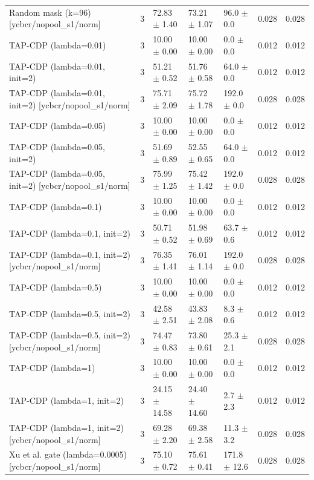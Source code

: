 \begin{tabular}{lrlllrr}
Random mask (k=96) [ycbcr/nopool_s1/norm] & 3 & 72.83 $\pm$ 1.40 & 73.21 $\pm$ 1.07 & 96.0 $\pm$ 0.0 & 0.028 & 0.028 \\
TAP-CDP (lambda=0.01) & 3 & 10.00 $\pm$ 0.00 & 10.00 $\pm$ 0.00 & 0.0 $\pm$ 0.0 & 0.012 & 0.012 \\
TAP-CDP (lambda=0.01, init=2) & 3 & 51.21 $\pm$ 0.52 & 51.76 $\pm$ 0.58 & 64.0 $\pm$ 0.0 & 0.012 & 0.012 \\
TAP-CDP (lambda=0.01, init=2) [ycbcr/nopool_s1/norm] & 3 & 75.71 $\pm$ 2.09 & 75.72 $\pm$ 1.78 & 192.0 $\pm$ 0.0 & 0.028 & 0.028 \\
TAP-CDP (lambda=0.05) & 3 & 10.00 $\pm$ 0.00 & 10.00 $\pm$ 0.00 & 0.0 $\pm$ 0.0 & 0.012 & 0.012 \\
TAP-CDP (lambda=0.05, init=2) & 3 & 51.69 $\pm$ 0.89 & 52.55 $\pm$ 0.65 & 64.0 $\pm$ 0.0 & 0.012 & 0.012 \\
TAP-CDP (lambda=0.05, init=2) [ycbcr/nopool_s1/norm] & 3 & 75.99 $\pm$ 1.25 & 75.42 $\pm$ 1.42 & 192.0 $\pm$ 0.0 & 0.028 & 0.028 \\
TAP-CDP (lambda=0.1) & 3 & 10.00 $\pm$ 0.00 & 10.00 $\pm$ 0.00 & 0.0 $\pm$ 0.0 & 0.012 & 0.012 \\
TAP-CDP (lambda=0.1, init=2) & 3 & 50.71 $\pm$ 0.52 & 51.98 $\pm$ 0.69 & 63.7 $\pm$ 0.6 & 0.012 & 0.012 \\
TAP-CDP (lambda=0.1, init=2) [ycbcr/nopool_s1/norm] & 3 & 76.35 $\pm$ 1.41 & 76.01 $\pm$ 1.14 & 192.0 $\pm$ 0.0 & 0.028 & 0.028 \\
TAP-CDP (lambda=0.5) & 3 & 10.00 $\pm$ 0.00 & 10.00 $\pm$ 0.00 & 0.0 $\pm$ 0.0 & 0.012 & 0.012 \\
TAP-CDP (lambda=0.5, init=2) & 3 & 42.58 $\pm$ 2.51 & 43.83 $\pm$ 2.08 & 8.3 $\pm$ 0.6 & 0.012 & 0.012 \\
TAP-CDP (lambda=0.5, init=2) [ycbcr/nopool_s1/norm] & 3 & 74.47 $\pm$ 0.83 & 73.80 $\pm$ 0.61 & 25.3 $\pm$ 2.1 & 0.028 & 0.028 \\
TAP-CDP (lambda=1) & 3 & 10.00 $\pm$ 0.00 & 10.00 $\pm$ 0.00 & 0.0 $\pm$ 0.0 & 0.012 & 0.012 \\
TAP-CDP (lambda=1, init=2) & 3 & 24.15 $\pm$ 14.58 & 24.40 $\pm$ 14.60 & 2.7 $\pm$ 2.3 & 0.012 & 0.012 \\
TAP-CDP (lambda=1, init=2) [ycbcr/nopool_s1/norm] & 3 & 69.28 $\pm$ 2.20 & 69.38 $\pm$ 2.58 & 11.3 $\pm$ 3.2 & 0.028 & 0.028 \\
Xu et al. gate (lambda=0.0005) [ycbcr/nopool_s1/norm] & 3 & 75.10 $\pm$ 0.72 & 75.61 $\pm$ 0.41 & 171.8 $\pm$ 12.6 & 0.028 & 0.028 \\

\end{tabular}
